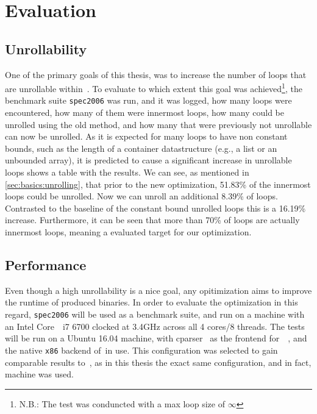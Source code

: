 \chapter{Evaluation}\label{sec:eval}

\section{Unrollability}\label{sec:eval:unrollability}

One of the primary goals of this thesis, was to increase the number of loops that are unrollable within~\libFIRM.
To evaluate to which extent this goal was achieved\footnote{N.B.: The test was conduncted with a max loop size of $\infty$}, the benchmark suite \texttt{spec2006} was run, and it was logged, how many loops were encountered, how many of them were innermost loops, how many could be unrolled using the old method, and how many that were previously not unrollable can now be unrolled.
As it is expected for many loops to have non constant bounds, such as the length of a container datastructure (e.g., a list or an unbounded array), it is predicted to cause a significant increase in unrollable loops
 shows a table with the results.
We can see, as mentioned in \cref{sec:basics:unrolling}, that prior to the new optimization, 51.83\% of the innermost loops could be unrolled.
Now we can unroll an additional 8.39\% of loops.
Contrasted to the baseline of the constant bound unrolled loops this is a 16.19\% increase.
Furthermore, it can be seen that more than 70\% of loops are actually innermost loops, meaning a evaluated target for our optimization.



\section{Performance}\label{sec:eval:perf}

Even though a high unrollability is a nice goal, any opitimization aims to improve the runtime of produced binaries.
In order to evaluate the optimization in this regard, \texttt{spec2006} will be used as a benchmark suite, and run on a machine with an Intel Core~\textregistered~i7 6700 clocked at 3.4GHz across all 4 cores/8 threads.
The tests will be run on a Ubuntu 16.04 machine, with cparser~\cite{cparser} as the frontend for~\libFIRM~, and the native \texttt{x86} backend of~\libFIRM in use.
This configuration was selected to gain comparable results to~\cite{aebi18bachelorarbeit}, as in this thesis the exact same configuration, and in fact, machine was used.

